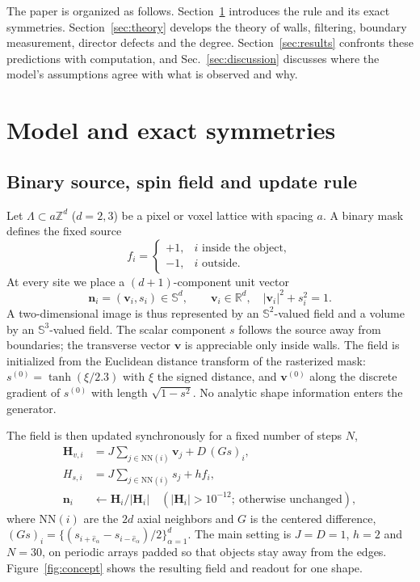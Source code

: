 \documentclass[11pt,a4paper]{article}
\newcommand{\nn}{\bm n}
\newcommand{\vv}{\bm v}
\newcommand{\Sn}{\mathbb S}
\begin{document}
The paper is organized as follows. Section~\ref{sec:model} introduces the rule and its exact symmetries. Section~\ref{sec:theory} develops the theory of walls, filtering, boundary measurement, director defects and the degree. Section~\ref{sec:results} confronts these predictions with computation, and Sec.~\ref{sec:discussion} discusses where the model's assumptions agree with what is observed and why.

\section{Model and exact symmetries}\label{sec:model}
\subsection{Binary source, spin field and update rule}
Let $\Lambda\subset a\mathbb Z^d$ ($d=2,3$) be a pixel or voxel lattice with spacing $a$. A binary mask defines the fixed source
\begin{equation}
 f_i=\begin{cases}+1,& i\text{ inside the object},\\ -1,& i\text{ outside}.\end{cases}
 \label{eq:binary}
\end{equation}
At every site we place a $(d+1)$-component unit vector
\begin{equation}
 \nn_i=(\vv_i,s_i)\in\Sn^d,\qquad \vv_i\in\mathbb R^d,\quad |\vv_i|^2+s_i^2=1 .
 \label{eq:spin}
\end{equation}
A two-dimensional image is thus represented by an $\Sn^2$-valued field and a volume by an $\Sn^3$-valued field. The scalar component $s$ follows the source away from boundaries; the transverse vector $\vv$ is appreciable only inside walls. The field is initialized from the Euclidean distance transform of the rasterized mask: $s^{(0)}=\tanh(\xi/2.3)$ with $\xi$ the signed distance, and $\vv^{(0)}$ along the discrete gradient of $s^{(0)}$ with length $\sqrt{1-s^2}$. No analytic shape information enters the generator.

The field is then updated synchronously for a fixed number of steps $N$,
\begin{align}
 \bm H_{v,i}&=J\!\!\sum_{j\in\mathrm{NN}(i)}\!\!\vv_j+D\,(Gs)_i,\label{eq:updatev}\\
 H_{s,i}&=J\!\!\sum_{j\in\mathrm{NN}(i)}\!\! s_j+h f_i,\label{eq:updates}\\
 \nn_i&\leftarrow\bm H_i/|\bm H_i|\quad(|\bm H_i|>10^{-12};\ \text{otherwise unchanged}),\label{eq:updaten}
\end{align}
where $\mathrm{NN}(i)$ are the $2d$ axial neighbors and $G$ is the centered difference, $(Gs)_i=\{(s_{i+\hat e_\alpha}-s_{i-\hat e_\alpha})/2\}_{\alpha=1}^d$. The main setting is $J=D=1$, $h=2$ and $N=30$, on periodic arrays padded so that objects stay away from the edges. Figure~\ref{fig:concept} shows the resulting field and readout for one shape.
\end{document}

